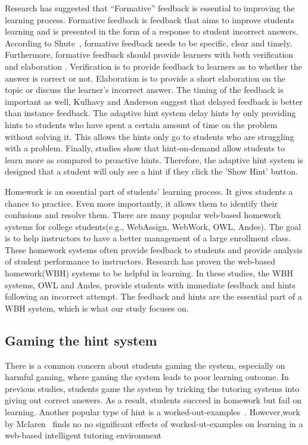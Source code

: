 \documentclass{sigchi/sigchi}
\begin{document}
Research has suggested that ``Formative'' feedback is essential to improving the learning process\cite{Azevedo1995}\cite{Bangert-Drowns1991}. Formative feedback is feedback that aims to improve students learning and is presented in the form of a response to student incorrect answers\cite{Shute2008}. According to Shute~\cite{Shute2008}, formative feedback needs to be specific, clear and timely. Furthermore, formative feedback should provide learners with both verification and elaboration \cite{Mason2001} \cite{Bangert-Drowns1991}. Verification is to provide feedback to learners as to whether the answer is correct or not. Elaboration is to provide a short elaboration on the topic or discuss the learner's incorrect answer. The timing of the feedback is important as well, Kulhavy and Anderson suggest that delayed feedback is better than instance feedback\cite{Kulhavy1972}. The adaptive hint system delay hints by only providing hints to students who have spent a certain amount of time on the problem without solving it. This allows the hints only go to students who are struggling with a problem. Finally, studies show that hint-on-demand allow students to learn more as compared to proactive hints\cite{Razzaq2010}. Therefore, the adaptive hint system is designed that a student will only see a hint if they click the 'Show Hint' button.

Homework is an essential part of students' learning
process\cite{Cooper2006}. It gives students a chance to practice. Even more importantly, it allows them to identify their confusions and resolve them. There are many popular web-based homework systems for college students(e.g., WebAssign, WebWork, OWL, Andes). The goal is to help instructors to have a better management of a large enrollment class. These homework systems often provide feedback to students and provide analysis of student performance to instructors. Research has proven the web-based homework(WBH) systems to be helpful in
learning\cite{MestHartRath2002}\cite{Vanlehn2005}. In these studies, the WBH systems, OWL and Andes, provide students with immediate feedback and hints following an incorrect
attempt\cite{MestHartRath2002}\cite{Vanlehn2005}. The feedback and hints are the essential part of a WBH system, which is what our study focuses on.

\subsection*{Gaming the hint system}

There is a common concern about students gaming the system, especially
on harmful gaming, where gaming the system leads to poor learning
outcome\cite{Baker2004}\cite{Baker2005}. In previous studies, students
game the system by tricking the tutoring systems into giving out
correct answers\cite{Baker2004Off-task}. As a result, students succeed
in homework but fail on learning. Another popular type of hint is a
worked-out-examples~\cite{Atkinson2000}.  However,work by
Mclaren~\cite{McLaren2006} finds no no significant effects of
worked-ut-examples on learning in a web-based intelligent tutoring
environment
\end{document}
